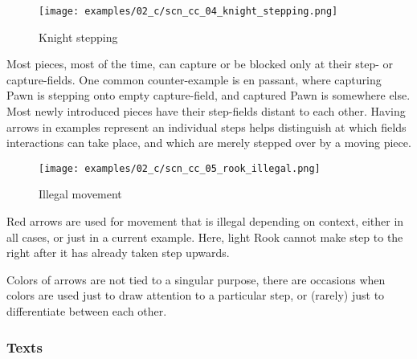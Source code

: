 \vspace*{6.7\baselineskip}
\noindent
\begin{wrapfigure}[15]{l}{0.4\textwidth}
\centering
\texttt{[image: examples/02\_c/scn\_cc\_04\_knight\_stepping.png]}
\vspace*{-1.4\baselineskip}
\caption{Knight stepping}
\label{fig:scn_cc_04_knight_stepping}
\end{wrapfigure}
Most pieces, most of the time, can capture or be blocked only at their step- or
capture-fields. One common counter-example is en passant, where capturing Pawn is
stepping onto empty capture-field, and captured Pawn is somewhere else.\newline
\indent
Most newly introduced pieces have their step-fields distant to each other. Having
arrows in examples represent an individual steps helps distinguish at which fields
interactions can take place, and which are merely stepped over by a moving piece.

\clearpage %

\vspace*{-1.4\baselineskip}
\noindent
\begin{wrapfigure}[13]{l}{0.4\textwidth}
\centering
\texttt{[image: examples/02\_c/scn\_cc\_05\_rook\_illegal.png]}
\vspace*{-1.4\baselineskip}
\caption{Illegal movement}
\label{fig:scn_cc_05_rook_illegal}
\end{wrapfigure}
Red arrows are used for movement that is illegal depending on context, either
in all cases, or just in a current example.\newline
\indent
Here, light Rook cannot make step to the right after it has already taken step
upwards.

Colors of arrows are not tied to a singular purpose, there are occasions when
colors are used just to draw attention to a particular step, or (rarely) just
to differentiate between each other.


\subsubsection*{Texts}
\label{sec:Classical Chess/Chessboard/Examples/Texts}

